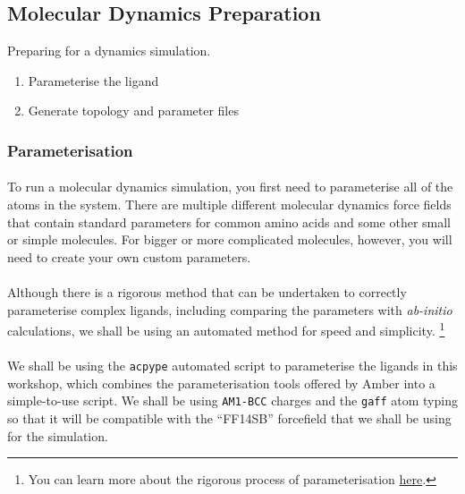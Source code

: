 \subsection{Molecular Dynamics Preparation}
    \begin{task}[label=task:Prep]{Preparing for a dynamics simulation.}
        \begin{enumerate}[label=(\alph*)]
            \item Parameterise the ligand
            \item Generate topology and parameter files
        \end{enumerate}
    \end{task}

\subsubsection{Parameterisation}
    \paragraph{}
        To run a molecular dynamics simulation, you first need to parameterise all of the atoms in the system. There are multiple different molecular dynamics force fields that contain standard parameters for common amino acids and some other small or simple molecules. For bigger or more complicated molecules, however, you will need to create your own custom parameters. 

    \paragraph{}
        Although there is a rigorous method that can be undertaken to correctly parameterise complex ligands, including comparing the parameters with \textit{ab-initio} calculations, we shall be using an automated method for speed and simplicity. \footnote{You can learn more about the rigorous process of parameterisation \href{http://ambermd.org/tutorials/basic/tutorial4b/}{here}.}

    \paragraph{}
        We shall be using the \texttt{acpype}\cite{SousadaSilva2012ACPYPEInterfacE} automated script to parameterise the ligands in this workshop, which combines the parameterisation tools offered by Amber into a simple-to-use script. We shall be using \texttt{AM1-BCC}\cite{Jakalian2002FastValidation} charges and the \texttt{gaff}\cite{Wang2004DevelopmentField} atom typing so that it will be compatible with the \enquote{FF14SB} forcefield\cite{Maier2015Ff14SB:Ff99SB} that we shall be using for the simulation. 

